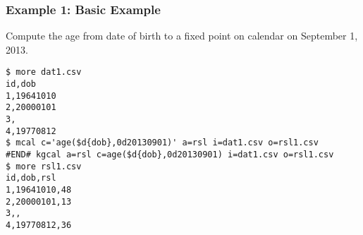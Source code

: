\subsubsection*{Example 1: Basic Example}

Compute the age from date of birth to a fixed point on calendar on September 1, 2013.


\begin{Verbatim}[baselinestretch=0.7,frame=single]
$ more dat1.csv
id,dob
1,19641010
2,20000101
3,
4,19770812
$ mcal c='age($d{dob},0d20130901)' a=rsl i=dat1.csv o=rsl1.csv
#END# kgcal a=rsl c=age($d{dob},0d20130901) i=dat1.csv o=rsl1.csv
$ more rsl1.csv
id,dob,rsl
1,19641010,48
2,20000101,13
3,,
4,19770812,36
\end{Verbatim}
